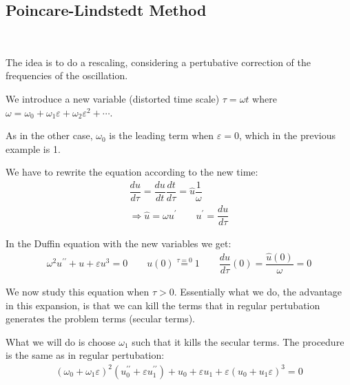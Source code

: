 \subsection{Poincare-Lindstedt Method}\hfill\\
\par\bigskip
\noindent The idea is to do a rescaling, considering a pertubative correction of the frequencies of the oscillation.
\par\bigskip
\noindent We introduce a new variable (distorted time scale) $\tau = \omega t$ where $\omega = \omega_0+\omega_1\varepsilon+\omega_2\varepsilon^2+\cdots$.\par
\noindent As in the other case, $\omega_0$ is the leading term when $\varepsilon=0$, which in the previous example is 1.
\par\bigskip
\noindent We have to rewrite the equation according to the new time:
\begin{equation*}
  \begin{gathered}
    \dfrac{du}{d\tau} = \dfrac{du}{dt}\dfrac{dt}{d\tau} = \hat{u}\dfrac{1}{\omega}\\
    \Rightarrow \hat{u} =\omega u^{\prime}\qquad u^{\prime} = \dfrac{du}{d\tau}
  \end{gathered}
\end{equation*}\par
\noindent In the Duffin equation with the new variables we get:
\begin{equation*}
  \begin{gathered}
    \omega^2u^{\prime\prime}+u+\varepsilon u^3=0 \qquad u(0) \stackrel{\tau=0}{=} 1\qquad \dfrac{du}{d\tau}(0)=\dfrac{\hat{u}(0)}{\omega} = 0
  \end{gathered}
\end{equation*}\par
\noindent We now study this equation when $\tau >0$. Essentially what we do, the advantage in this expansion, is that we can kill the terms that in regular pertubation generates the problem terms (secular terms).\par
\noindent What we will do is choose $\omega_1$ such that it kills the secular terms. The procedure is the same as in regular pertubation:
\begin{equation*}
  \begin{gathered}
    (\omega_0+\omega_1\varepsilon)^2(u^{\prime\prime}_0+\varepsilon u^{\prime\prime}_1)+u_0+\varepsilon u_1+\varepsilon(u_0+u_1\varepsilon)^3=0
  \end{gathered}
\end{equation*}\par
